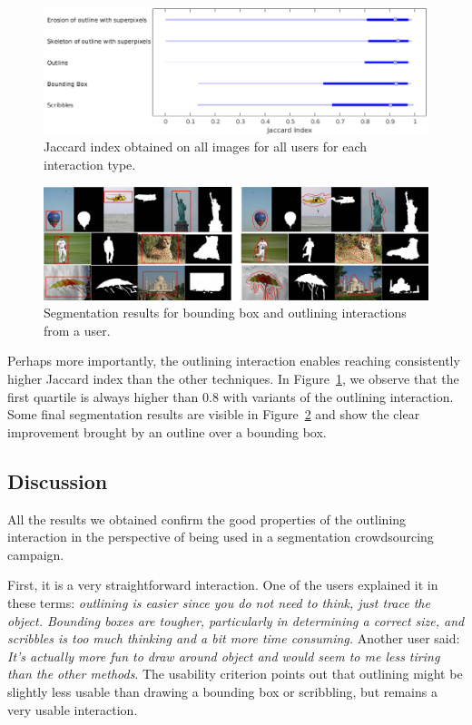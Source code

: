 \begin{figure}[ht]
\includegraphics[width=\columnwidth]{assets/plot/jaccard.png}
\caption{Jaccard index obtained on all images for all users
for each interaction type.}%
\label{fig:jaccard}
\end{figure}


\begin{figure}[ht]
\includegraphics[width=\textwidth]{assets/img/results.jpg}
\caption{Segmentation results for bounding box
and outlining interactions from a user.}%
\label{fig:results}
\end{figure}


Perhaps more importantly, the outlining interaction enables reaching
consistently higher Jaccard index than the other techniques.
In Figure~\ref{fig:jaccard}, we observe that the first quartile is
always higher than 0.8 with variants of the outlining interaction.
Some final segmentation results are visible in Figure~\ref{fig:results}
and show the clear improvement brought by an outline over a bounding box.


\subsection{Discussion}


All the results we obtained confirm the good properties
of the outlining interaction in the perspective of being used
in a segmentation crowdsourcing campaign.


First, it is a very straightforward interaction.
One of the users explained it in these terms:
\textit{outlining is easier since you do not need to think,
just trace the object.
Bounding boxes are tougher, particularly in determining a correct size,
and scribbles is too much thinking and a bit more time consuming.}
Another user said: \textit{It's actually more fun to draw around object
and would seem to me less tiring than the other methods}.
The usability criterion points out that outlining might be slightly less
usable than drawing a bounding box or scribbling,
but remains a very usable interaction.


